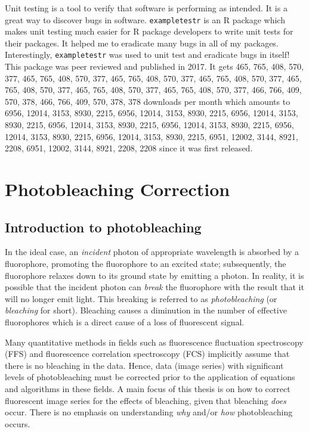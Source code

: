 \documentclass[12pt,]{book}
\theoremstyle{definition}
\theoremstyle{definition}
\theoremstyle{definition}
\theoremstyle{remark}
\begin{document}
Unit testing is a tool to verify that software is performing as
intended. It is a great way to discover bugs in software.
\texttt{exampletestr} is an R package which makes unit testing much
easier for R package developers to write unit tests for their packages.
It helped me to eradicate many bugs in all of my packages.
Interestingly, \texttt{exampletestr} was used to unit test and eradicate
bugs in itself! This package was peer reviewed and published in
2017.\citep{exampletestr} It gets 465, 765, 408, 570, 377, 465, 765,
408, 570, 377, 465, 765, 408, 570, 377, 465, 765, 408, 570, 377, 465,
765, 408, 570, 377, 465, 765, 408, 570, 377, 465, 765, 408, 570, 377,
466, 766, 409, 570, 378, 466, 766, 409, 570, 378, 378 downloads per
month which amounts to 6956, 12014, 3153, 8930, 2215, 6956, 12014, 3153,
8930, 2215, 6956, 12014, 3153, 8930, 2215, 6956, 12014, 3153, 8930,
2215, 6956, 12014, 3153, 8930, 2215, 6956, 12014, 3153, 8930, 2215,
6956, 12014, 3153, 8930, 2215, 6951, 12002, 3144, 8921, 2208, 6951,
12002, 3144, 8921, 2208, 2208 since it was first released.

\chapter{Photobleaching Correction}\label{photobleaching-correction}

\section{Introduction to
photobleaching}\label{introduction-to-photobleaching}

In the ideal case, an \emph{incident} photon of appropriate wavelength
is absorbed by a fluorophore, promoting the fluorophore to an excited
state; subsequently, the fluorophore relaxes down to its ground state by
emitting a photon. In reality, it is possible that the incident photon
can \emph{break} the fluorophore with the result that it will no longer
emit light. This breaking is referred to as \emph{photobleaching} (or
\emph{bleaching} for short). Bleaching causes a diminution in the number
of effective fluorophores which is a direct cause of a loss of
fluorescent signal.

Many quantitative methods in fields such as fluorescence fluctuation
spectroscopy (FFS) and fluorescence correlation spectroscopy (FCS)
implicitly assume that there is no bleaching in the data. Hence, data
(image series) with significant levels of photobleaching must be
corrected prior to the application of equations and algorithms in these
fields. A main focus of this thesis is on how to correct fluorescent
image series for the effects of bleaching, given that bleaching
\emph{does} occur. There is no emphasis on understanding \emph{why}
and/or \emph{how} photobleaching occurs.
\end{document}
